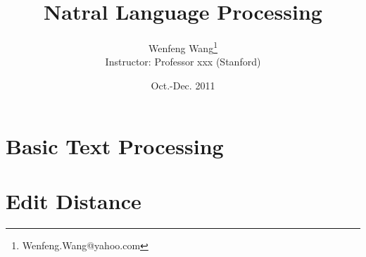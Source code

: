 \documentclass[fleqn,twoside]{article}
\begin{document}
\title{Natral Language Processing }


\author{ Wenfeng Wang\footnote{ Wenfeng.Wang@yahoo.com} \\
 Instructor: Professor xxx (Stanford) \\
 }
\date{ Oct.-Dec. 2011} 


\maketitle


\tableofcontents

\section{Basic Text Processing}

\section{Edit Distance}
\end{document}

